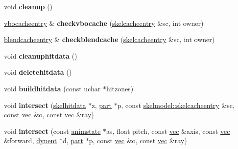 \begin{DoxyCompactItemize}
void {\bfseries cleanup} ()
\item 
\mbox{\label{structskelmodel_1_1skelmeshgroup_a3cf0cd2090930b2ad96215b031315724}} 
\hyperlink{structskelmodel_1_1vbocacheentry}{vbocacheentry} \& {\bfseries checkvbocache} (\hyperlink{structskelmodel_1_1skelcacheentry}{skelcacheentry} \&sc, int owner)
\item 
\mbox{\label{structskelmodel_1_1skelmeshgroup_ae43865ccf9b277a1196565ed3c34152e}} 
\hyperlink{structskelmodel_1_1blendcacheentry}{blendcacheentry} \& {\bfseries checkblendcache} (\hyperlink{structskelmodel_1_1skelcacheentry}{skelcacheentry} \&sc, int owner)
\item 
\mbox{\label{structskelmodel_1_1skelmeshgroup_a778cc4ce95938a4149a61462a6b7d5a0}} 
void {\bfseries cleanuphitdata} ()
\item 
\mbox{\label{structskelmodel_1_1skelmeshgroup_aa25b5a2babcfd88ca3235399fb6505e0}} 
void {\bfseries deletehitdata} ()
\item 
\mbox{\label{structskelmodel_1_1skelmeshgroup_a0c7a226ad69b57216a3d0744c5132f06}} 
void {\bfseries buildhitdata} (const uchar $\ast$hitzones)
\item 
\mbox{\label{structskelmodel_1_1skelmeshgroup_a89ee055a7bb541b1227664eac364ca00}} 
void {\bfseries intersect} (\hyperlink{structskelhitdata}{skelhitdata} $\ast$z, \hyperlink{structanimmodel_1_1part}{part} $\ast$p, const \hyperlink{structskelmodel_1_1skelcacheentry}{skelmodel\+::skelcacheentry} \&sc, const \hyperlink{structvec}{vec} \&o, const \hyperlink{structvec}{vec} \&ray)
\item 
\mbox{\label{structskelmodel_1_1skelmeshgroup_a6765f5abc34d11dc76d3261ef3abbfcc}} 
void {\bfseries intersect} (const \hyperlink{structanimmodel_1_1animstate}{animstate} $\ast$as, float pitch, const \hyperlink{structvec}{vec} \&axis, const \hyperlink{structvec}{vec} \&forward, \hyperlink{structdynent}{dynent} $\ast$d, \hyperlink{structanimmodel_1_1part}{part} $\ast$p, const \hyperlink{structvec}{vec} \&o, const \hyperlink{structvec}{vec} \&ray)

\end{DoxyCompactItemize}

